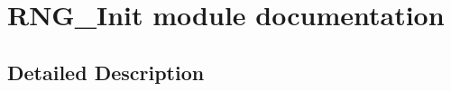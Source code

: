 \hypertarget{group___r_n_g___init__module}{}\section{R\+N\+G\+\_\+\+Init module documentation}
\label{group___r_n_g___init__module}


\subsection{Detailed Description}
